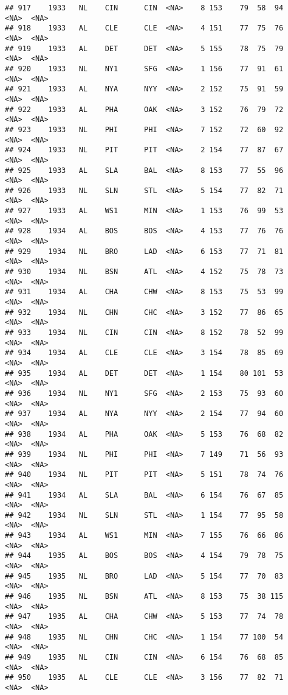 \documentclass[]{article}
\begin{document}
\begin{verbatim}
## 917    1933   NL    CIN      CIN  <NA>    8 153    79  58  94   <NA>  <NA>
## 918    1933   AL    CLE      CLE  <NA>    4 151    77  75  76   <NA>  <NA>
## 919    1933   AL    DET      DET  <NA>    5 155    78  75  79   <NA>  <NA>
## 920    1933   NL    NY1      SFG  <NA>    1 156    77  91  61   <NA>  <NA>
## 921    1933   AL    NYA      NYY  <NA>    2 152    75  91  59   <NA>  <NA>
## 922    1933   AL    PHA      OAK  <NA>    3 152    76  79  72   <NA>  <NA>
## 923    1933   NL    PHI      PHI  <NA>    7 152    72  60  92   <NA>  <NA>
## 924    1933   NL    PIT      PIT  <NA>    2 154    77  87  67   <NA>  <NA>
## 925    1933   AL    SLA      BAL  <NA>    8 153    77  55  96   <NA>  <NA>
## 926    1933   NL    SLN      STL  <NA>    5 154    77  82  71   <NA>  <NA>
## 927    1933   AL    WS1      MIN  <NA>    1 153    76  99  53   <NA>  <NA>
## 928    1934   AL    BOS      BOS  <NA>    4 153    77  76  76   <NA>  <NA>
## 929    1934   NL    BRO      LAD  <NA>    6 153    77  71  81   <NA>  <NA>
## 930    1934   NL    BSN      ATL  <NA>    4 152    75  78  73   <NA>  <NA>
## 931    1934   AL    CHA      CHW  <NA>    8 153    75  53  99   <NA>  <NA>
## 932    1934   NL    CHN      CHC  <NA>    3 152    77  86  65   <NA>  <NA>
## 933    1934   NL    CIN      CIN  <NA>    8 152    78  52  99   <NA>  <NA>
## 934    1934   AL    CLE      CLE  <NA>    3 154    78  85  69   <NA>  <NA>
## 935    1934   AL    DET      DET  <NA>    1 154    80 101  53   <NA>  <NA>
## 936    1934   NL    NY1      SFG  <NA>    2 153    75  93  60   <NA>  <NA>
## 937    1934   AL    NYA      NYY  <NA>    2 154    77  94  60   <NA>  <NA>
## 938    1934   AL    PHA      OAK  <NA>    5 153    76  68  82   <NA>  <NA>
## 939    1934   NL    PHI      PHI  <NA>    7 149    71  56  93   <NA>  <NA>
## 940    1934   NL    PIT      PIT  <NA>    5 151    78  74  76   <NA>  <NA>
## 941    1934   AL    SLA      BAL  <NA>    6 154    76  67  85   <NA>  <NA>
## 942    1934   NL    SLN      STL  <NA>    1 154    77  95  58   <NA>  <NA>
## 943    1934   AL    WS1      MIN  <NA>    7 155    76  66  86   <NA>  <NA>
## 944    1935   AL    BOS      BOS  <NA>    4 154    79  78  75   <NA>  <NA>
## 945    1935   NL    BRO      LAD  <NA>    5 154    77  70  83   <NA>  <NA>
## 946    1935   NL    BSN      ATL  <NA>    8 153    75  38 115   <NA>  <NA>
## 947    1935   AL    CHA      CHW  <NA>    5 153    77  74  78   <NA>  <NA>
## 948    1935   NL    CHN      CHC  <NA>    1 154    77 100  54   <NA>  <NA>
## 949    1935   NL    CIN      CIN  <NA>    6 154    76  68  85   <NA>  <NA>
## 950    1935   AL    CLE      CLE  <NA>    3 156    77  82  71   <NA>  <NA>

\end{verbatim}
\end{document}
